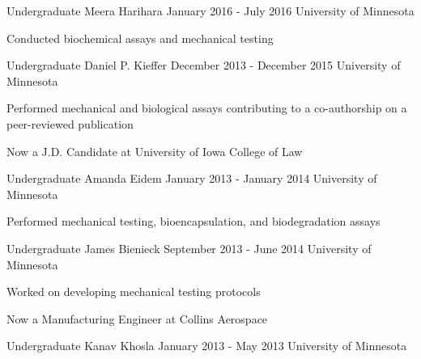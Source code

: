 \documentclass[11pt, letterpaper]{awesome-cv} %
\begin{document}
\begin{sloppypar}
\begin{cventries}
	
	\cventry
	{Undergraduate}
	{Meera Harihara}
	{January 2016 - July 2016}
	{University of Minnesota}
	{
		\begin{cvitems}
			\item {Conducted biochemical assays and mechanical testing}
		\end{cvitems}		
	}
	\cventry
	{Undergraduate}
	{Daniel P. Kieffer}
	{December 2013 - December 2015}
	{University of Minnesota}
	{
		\begin{cvitems}
			\item {Performed mechanical and biological assays contributing to a co-authorship on a peer-reviewed publication}
			\item {Now a J.D. Candidate at University of Iowa College of Law}
		\end{cvitems}		
	}	
	\cventry
	{Undergraduate}
	{Amanda Eidem}
	{January 2013 - January 2014}
	{University of Minnesota}
	{
		\begin{cvitems}
			\item {Performed mechanical testing, bioencapsulation, and biodegradation assays}
		\end{cvitems}		
	}	
	\cventry
	{Undergraduate}
	{James Bienieck}
	{September 2013 - June 2014}
	{University of Minnesota}
	{
		\begin{cvitems}
			\item {Worked on developing mechanical testing protocols}
			\item {Now a Manufacturing Engineer at Collins Aerospace}
		\end{cvitems}		
	}	
	\cventry
	{Undergraduate}
	{Kanav Khosla}
	{January 2013 - May 2013}
	{University of Minnesota}
	{
	}
\end{cventries}


\end{sloppypar}
\end{document}
